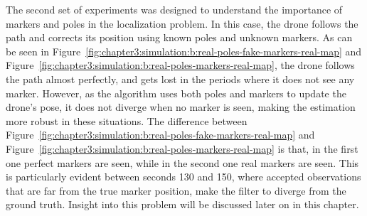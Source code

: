 The second set of experiments was designed to understand the importance of markers and poles in the localization problem. In this case, the drone follows the path and corrects its position using known poles and unknown markers. As can be seen in Figure~\ref{fig:chapter3:simulation:b:real-poles-fake-markers-real-map} and Figure~\ref{fig:chapter3:simulation:b:real-poles-markers-real-map}, the drone follows the path almost perfectly, and gets lost in the periods where it does not see any marker. However, as the algorithm uses both poles and markers to update the drone's pose, it does not diverge when no marker is seen, making the estimation more robust in these situations. The difference between Figure~\ref{fig:chapter3:simulation:b:real-poles-fake-markers-real-map} and Figure~\ref{fig:chapter3:simulation:b:real-poles-markers-real-map} is that, in the first one perfect markers are seen, while in the second one real markers are seen. This is particularly evident between seconds 130 and 150, where accepted observations that are far from the true marker position, make the filter to diverge from the ground truth. Insight into this problem will be discussed later on in this chapter.\\
